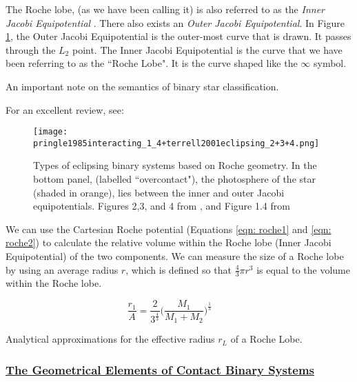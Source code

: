 \documentclass[12pt]{article} %
\numberwithin{equation}{section} %
\begin{document}
The Roche lobe, (as we have been calling it) is also referred to as the \emph{Inner Jacobi Equipotential} . There also exists an \emph{Outer Jacobi Equipotential}. In Figure \ref{fig: pringle1985interacting_1_4+terrell2001eclipsing_2+3+4}, the Outer Jacobi Equipotential is the outer-most curve that is drawn. It passes through the $L_{2}$ point. The Inner Jacobi Equipotential is the curve that we have been referring to as the ``Roche Lobe". It is the curve shaped like the $\infty$ symbol.

An important note on the semantics of binary star classification. \citet{kuiper1941interpretation}

For an excellent review, see: \citep{kallrath2009eclipsing}

\begin{figure}[H]
\centering
\texttt{[image: pringle1985interacting\_1\_4+terrell2001eclipsing\_2+3+4.png]}
\caption{Types of eclipsing binary systems based on Roche geometry. In the bottom panel, (labelled ``overcontact"), the photosphere of the star (shaded in orange), lies between the inner and outer Jacobi equipotentials. Figures 2,3, and 4 from \citet{terrell2001eclipsing}, and Figure 1.4 from \citet{pringle1985interacting}}
\label{fig: pringle1985interacting_1_4+terrell2001eclipsing_2+3+4}
\end{figure}

We can use the Cartesian Roche potential (Equations \ref{eqn: roche1} and \ref{eqn: roche2}) to calculate the relative volume within the Roche lobe (Inner Jacobi Equipotential) of the two components. We can measure the size of a Roche lobe by using an average radius $r$, which is defined so that $\frac{4}{3} \pi r^{3}$ is equal to the volume within the Roche lobe.

\citet{paczynski1971evolutionary}

\begin{equation} \label{paczynski1971evolutionary_4}
\frac{r_{1}}{A} = \frac{2}{3^{\frac{4}{3}}} \Big( \frac{M_{1}}{M_{1} + M_{2}} \Big)^{\frac{1}{3}} \qquad 
\end{equation}

Analytical approximations for the effective radius $r_{L}$ of a Roche Lobe. \citet{eggleton1983approximation}

\subsubsection[The Geometrical Elements of Contact Binary Systems]{\hyperlink{toc}{The Geometrical Elements of Contact Binary Systems}} \label{sec: The Geometrical Elements of Contact Binary Systems}
\end{document}
